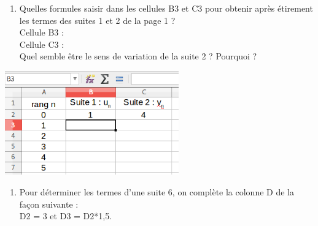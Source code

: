 \documentclass[a4paper,11pt,exos]{nsi} %
\begin{document}
\exo{}
\begin{minipage}{9cm}
	\begin{enumerate}
		\item 	Quelles formules saisir dans les cellules B3 et C3 pour obtenir après étirement les termes des suites 1 et 2 de la page 1 ?\\[.5em]
		Cellule B3 : \dotfill\\[.5em]
		Cellule C3 : \dotfill\\[.5em]
		Quel semble être le sens de variation de la suite 2 ? Pourquoi ?
	\end{enumerate}
\end{minipage}
\begin{minipage}{8cm}
	\flushright \includegraphics[width=7.5cm]{tableur}
\end{minipage}
\flushright {}

\begin{enumerate}[label=\bfseries 2.]
	\item 	 Pour déterminer les termes d'une suite 6, on complète la colonne D de la façon suivante :\\
	D2 = 3 \hspace{.2cm} et \hspace{.2cm} D3 = D2*1,5.
\end{enumerate}
\end{document}
